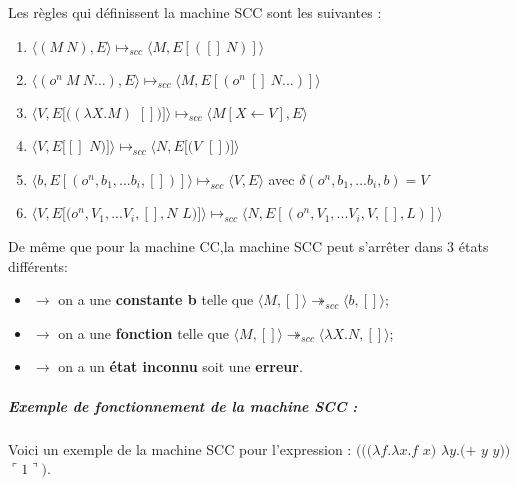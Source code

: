 \documentclass[10pt,a4paper]{article}
\begin{document}
				
				Les règles qui définissent la machine SCC sont les suivantes :
				
				\begin{enumerate}
					\item $\langle(M~N),E\rangle \longmapsto_{scc} \langle M,E[([]~N)]\rangle$
					
					\item $\langle(o^{n}~M~N...),E\rangle \longmapsto_{scc} \langle M,E[(o^{n}~[]~N...)]\rangle$
					
					\item $\langle V,E[((\lambda X.M)$ $[])]\rangle \longmapsto_{scc} \langle M[X\leftarrow V],E\rangle$
					
					\item $\langle V,E[[]$ $N)]\rangle \longmapsto_{scc} \langle N,E[(V$ $[])]\rangle$
					
					\item $\langle b,E[(o^{n},b_{1},...b_{i},[])]\rangle \longmapsto_{scc} \langle V,E\rangle$ avec $\delta
					 (o^{n},b_{1},...b_{i},b)=V$ 
					 
					\item $\langle V,E[(o^{n},V_{1},...V_{i},[],N$ $L)]\rangle \longmapsto_{scc} \langle N,E[(o^{n},V_{1},...V_{i},V,[],L)]\rangle$
				\end{enumerate}
				\bigbreak
				
			
				De même que pour la machine CC,la machine SCC peut s'arrêter dans 3 états différents:
				\begin{itemize}
					\item[]$\longrightarrow$ on a une \textbf{constante b} telle que $\langle M,[]\rangle \twoheadrightarrow_{scc} \langle b,[]\rangle$;
					\item[]$\longrightarrow$ on a une \textbf{fonction} telle que $\langle M,[]\rangle \twoheadrightarrow_{scc} \langle\lambda X.N,[]\rangle$;
					\item[]$\longrightarrow$ on a un \textbf{état inconnu} soit une \textbf{erreur}.
				\end{itemize}
				\bigbreak
				
				
				\subparagraph{Exemple de fonctionnement de la machine SCC :}
					Voici un exemple de la machine SCC pour l'expression : 
					\smallbreak 
					$(((\lambda f.\lambda x.f$ $x)$ $\lambda y.(+$ $y$ $y))$ $\ulcorner 1\urcorner)$.
				
\end{document}
